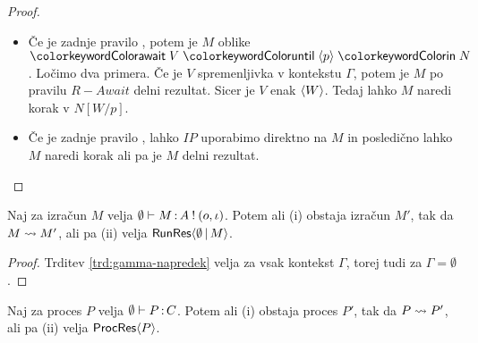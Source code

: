 \begin{proof}
\begin{itemize}
		\item Če je zadnje pravilo , potem je $M$ oblike $\tmawait{V}{p}{N}$.
		Ločimo dva primera.
		Če je $V$ spremenljivka v kontekstu $\Gamma$, potem je $M$ po pravilu $R-Await$ delni rezultat.
		Sicer je $V$ enak $\langle W \rangle$. Tedaj lahko $M$ naredi korak v $N[W/p]$.
		
		\item Če je zadnje pravilo , lahko $IP$ uporabimo direktno na $M$ in posledično lahko $M$ naredi korak ali pa je $M$ delni rezultat.
			
	\end{itemize}
	
\end{proof}


\begin{posledica}[o napredku]\label{pos:prazen-napredek}
	Naj za izračun $M$ velja $\emptyset \vdash M \mathinner{:} A \mathbin{!} (o, \iota)$. Potem ali (i) obstaja izračun $M'$, tak da $M \leadsto M'$, ali pa (ii) velja $\mathsf{RunRes}\langle\emptyset \,\vert\, M\rangle$.
\end{posledica}

\begin{proof}
	Trditev \ref{trd:gamma-napredek} velja za vsak kontekst $\Gamma$, torej tudi za $\Gamma = \emptyset$.
\end{proof}


\begin{izrek}[o napredku]
	Naj za proces $P$ velja $\emptyset \vdash P \mathinner{:} C$. Potem ali (i) obstaja proces $P'$, tak da $P \leadsto P'$, ali pa (ii) velja $\mathsf{ProcRes}\langle P \rangle$.
\end{izrek}

